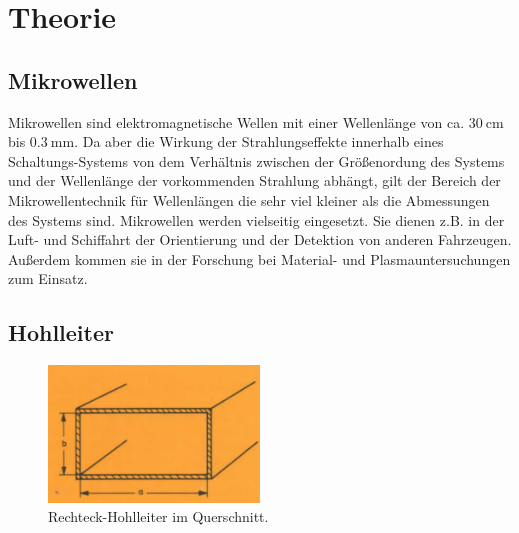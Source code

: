 \section{Theorie}
\label{sec:Theorie}



\subsection{Mikrowellen}

Mikrowellen sind elektromagnetische Wellen mit einer Wellenlänge von ca. $\SI{30}{\centi\m}$ bis $\SI{0.3}{\milli\m}$. Da aber die Wirkung der Strahlungseffekte innerhalb eines Schaltungs-Systems von dem Verhältnis zwischen der Größenordung des Systems und der Wellenlänge der vorkommenden Strahlung abhängt, gilt der Bereich der Mikrowellentechnik für Wellenlängen die sehr viel kleiner als die Abmessungen des Systems sind. Mikrowellen werden vielseitig eingesetzt. Sie dienen z.B. in der Luft- und Schiffahrt der Orientierung und der Detektion von anderen Fahrzeugen. Außerdem kommen sie in der Forschung bei Material- und Plasmauntersuchungen zum Einsatz. 

\subsection{Hohlleiter}


\begin{figure}
    \centering
    \includegraphics[width=0.5\textwidth]{Bilder/hohlleiter_querschnitt.PNG}
    \caption{Rechteck-Hohlleiter im Querschnitt.}
    \label{fig:hohlleiter}
\end{figure}



